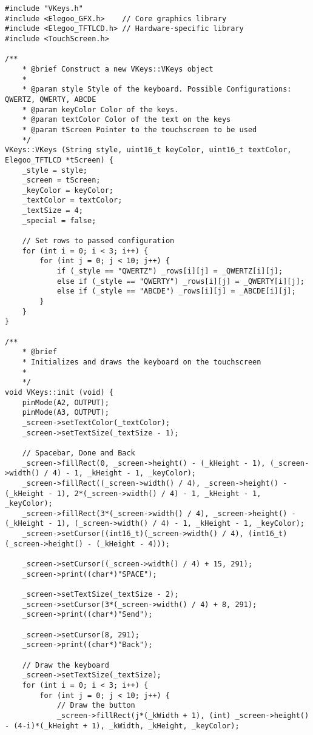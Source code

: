 \documentclass[a4paper, 11pt]{scrartcl}
\begin{document}
\begin{lstlisting}
#include "VKeys.h"
#include <Elegoo_GFX.h>    // Core graphics library
#include <Elegoo_TFTLCD.h> // Hardware-specific library
#include <TouchScreen.h>

/**
    * @brief Construct a new VKeys::VKeys object
    * 
    * @param style Style of the keyboard. Possible Configurations: QWERTZ, QWERTY, ABCDE
    * @param keyColor Color of the keys. 
    * @param textColor Color of the text on the keys
    * @param tScreen Pointer to the touchscreen to be used
    */
VKeys::VKeys (String style, uint16_t keyColor, uint16_t textColor, Elegoo_TFTLCD *tScreen) {
    _style = style;
    _screen = tScreen;
    _keyColor = keyColor;
    _textColor = textColor;
    _textSize = 4;
    _special = false;

    // Set rows to passed configuration
    for (int i = 0; i < 3; i++) {
        for (int j = 0; j < 10; j++) {
            if (_style == "QWERTZ") _rows[i][j] = _QWERTZ[i][j];
            else if (_style == "QWERTY") _rows[i][j] = _QWERTY[i][j];
            else if (_style == "ABCDE") _rows[i][j] = _ABCDE[i][j];
        }
    }
}

/**
    * @brief 
    * Initializes and draws the keyboard on the touchscreen
    * 
    */
void VKeys::init (void) {
    pinMode(A2, OUTPUT);
    pinMode(A3, OUTPUT);
    _screen->setTextColor(_textColor);
    _screen->setTextSize(_textSize - 1);

    // Spacebar, Done and Back
    _screen->fillRect(0, _screen->height() - (_kHeight - 1), (_screen->width() / 4) - 1, _kHeight - 1, _keyColor);
    _screen->fillRect((_screen->width() / 4), _screen->height() - (_kHeight - 1), 2*(_screen->width() / 4) - 1, _kHeight - 1, _keyColor);
    _screen->fillRect(3*(_screen->width() / 4), _screen->height() - (_kHeight - 1), (_screen->width() / 4) - 1, _kHeight - 1, _keyColor);
    _screen->setCursor((int16_t)(_screen->width() / 4), (int16_t)(_screen->height() - (_kHeight - 4)));

    _screen->setCursor((_screen->width() / 4) + 15, 291);    
    _screen->print((char*)"SPACE");

    _screen->setTextSize(_textSize - 2);
    _screen->setCursor(3*(_screen->width() / 4) + 8, 291);    
    _screen->print((char*)"Send");

    _screen->setCursor(8, 291);    
    _screen->print((char*)"Back");

    // Draw the keyboard
    _screen->setTextSize(_textSize);
    for (int i = 0; i < 3; i++) {
        for (int j = 0; j < 10; j++) {
            // Draw the button
            _screen->fillRect(j*(_kWidth + 1), (int) _screen->height() - (4-i)*(_kHeight + 1), _kWidth, _kHeight, _keyColor);
            

\end{lstlisting}
\end{document}
